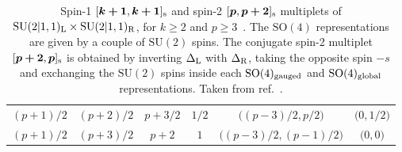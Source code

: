 \documentclass[11pt]{article}
\newcommand{\SO}{\ensuremath{\mathrm{SO}}\xspace}
\newcommand{\SU}{\ensuremath{\mathrm{SU}}\xspace}
\begin{document}
\begin{table}[t!]
\begin{tabular}{cccccc}
    $(p+1)/2$ & $(p+2)/2$ & $p+3/2$ & $1/2$ & $\big((p-3)/2,p/2\big)$ & $\big(0,1/2\big)$ \\
    $(p+1)/2$ & $(p+3)/2$ & $p+2$ & $1$ & $\big((p-3)/2,(p-1)/2\big)$ & $\big(0,0\big)$
  \end{tabular}
  \caption{Spin-1 $[\boldsymbol{k+1},\boldsymbol{k+1}]_{\rm s}$ and spin-2 $[\boldsymbol{p},\boldsymbol{p+2}]_{\rm s}$ multiplets of $\SU(2\vert1,1)_{\rm L}\times \SU(2\vert1,1)_{\rm R}$, for $k\geq2$ and $p\geq3$~\cite{deBoer:1998kjm}. The $\SO(4)$ representations are given by a couple of $\SU(2)$ spins. The conjugate spin-2 multiplet $[\boldsymbol{p+2},\boldsymbol{p}]_{\rm s}$ is obtained by inverting $\Delta_{\rm L}$ with $\Delta_{\rm R}$, taking the opposite spin $-s$ and exchanging the $\SU(2)$ spins inside each $\SO(4)_{\rm gauged}$ and $\SO(4)_{\rm global}$ representations. Taken from ref.~\cite{Eloy:2020uix}.}
  \label{tab:multi20}
\end{table}


\end{document}
